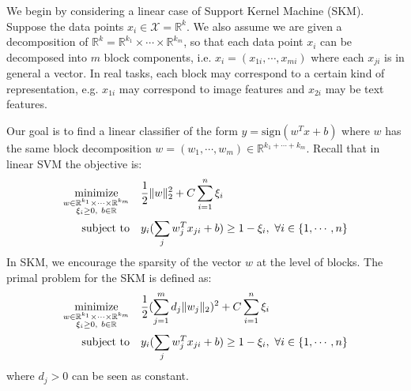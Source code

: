 We begin by considering a linear case of Support Kernel Machine (SKM). Suppose the data points $x_i\in\mathcal{X}=\mathbb{R}^k$. We also assume we are given a decomposition of $\mathbb{R}^k=\mathbb{R}^{k_1}\times\cdots\times\mathbb{R}^{k_m}$, so that each data point $x_i$ can be decomposed into $m$ block components, i.e. $x_i=(x_{1i},\cdots,x_{mi})$ where each $x_{ji}$ is in general a vector. In real tasks, each block may correspond to a certain kind of representation, e.g. $x_{1i}$ may correspond to image features and $x_{2i}$ may be text features.

Our goal is to find a linear classifier of the form $y=\textrm{sign}(w^Tx+b)$ where $w$ has the same block decomposition $w=(w_1,\cdots,w_m)\in\mathbb{R}^{k_1+\cdots+k_m}$. Recall that in linear SVM the objective is:
\begin{align}
\mini_{\substack{w \in \mathbb{R}^{k_1}\times\cdots\times\mathbb{R}^{k_m} \\
\xi_i\ge0, \ 
b\in\mathbb{R}}} & \quad \frac{1}{2}\|w\|_2^2+C\sum_{i=1}^n\xi_i \\
\subto & \quad y_i(\sum_j w_j^T x_{ji}+b)\ge 1-\xi_i, \ \forall i \in\{1,\cdots,n\}
\end{align}
In SKM, we encourage the sparsity of the vector $w$ at the level of blocks. The primal problem for the SKM is defined as:
\begin{align}
\mini_{\substack{w \in \mathbb{R}^{k_1}\times\cdots\times\mathbb{R}^{k_m} \\ \xi_i\ge0, \ b\in\mathbb{R}}} 
& \quad \frac{1}{2}(\sum_{j=1}^m d_j \|w_j\|_2)^2+C\sum_{i=1}^n\xi_i\\
\subto & \quad y_i(\sum_j w_j^T x_{ji}+b)\ge 1-\xi_i, \ \forall i \in\{1,\cdots,n\}
\end{align}
where $d_j>0$ can be seen as constant.
